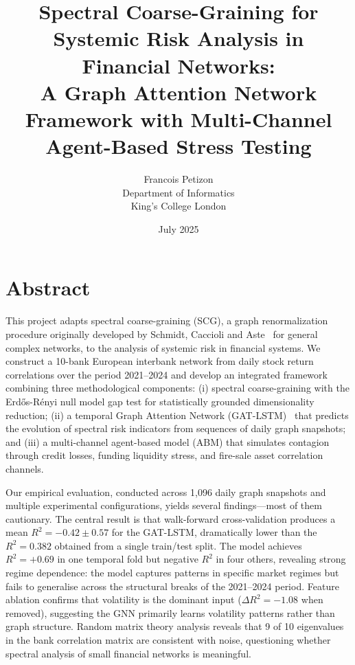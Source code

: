 \documentclass[11pt,a4paper]{report}
\title{\textbf{Spectral Coarse-Graining for Systemic Risk Analysis in Financial Networks:\\A Graph Attention Network Framework with Multi-Channel Agent-Based Stress Testing}}
\author{Francois Petizon \\
Department of Informatics \\
King's College London}
\date{July 2025}
\begin{document}
\maketitle

\chapter*{Abstract}

This project adapts spectral coarse-graining (SCG), a graph renormalization procedure originally developed by Schmidt, Caccioli and Aste~\cite{schmidt2024spectral} for general complex networks, to the analysis of systemic risk in financial systems. We construct a 10-bank European interbank network from daily stock return correlations over the period 2021--2024 and develop an integrated framework combining three methodological components: (i) spectral coarse-graining with the Erd\H{o}s-R\'enyi null model gap test for statistically grounded dimensionality reduction; (ii) a temporal Graph Attention Network (GAT-LSTM)~\cite{velickovic2018graph} that predicts the evolution of spectral risk indicators from sequences of daily graph snapshots; and (iii) a multi-channel agent-based model (ABM) that simulates contagion through credit losses, funding liquidity stress, and fire-sale asset correlation channels.

Our empirical evaluation, conducted across 1,096 daily graph snapshots and multiple experimental configurations, yields several findings---most of them cautionary. The central result is that walk-forward cross-validation produces a mean $R^2 = -0.42 \pm 0.57$ for the GAT-LSTM, dramatically lower than the $R^2 = 0.382$ obtained from a single train/test split. The model achieves $R^2 = +0.69$ in one temporal fold but negative $R^2$ in four others, revealing strong regime dependence: the model captures patterns in specific market regimes but fails to generalise across the structural breaks of the 2021--2024 period. Feature ablation confirms that volatility is the dominant input ($\Delta R^2 = -1.08$ when removed), suggesting the GNN primarily learns volatility patterns rather than graph structure. Random matrix theory analysis reveals that 9 of 10 eigenvalues in the bank correlation matrix are consistent with noise, questioning whether spectral analysis of small financial networks is meaningful.
\end{document}
